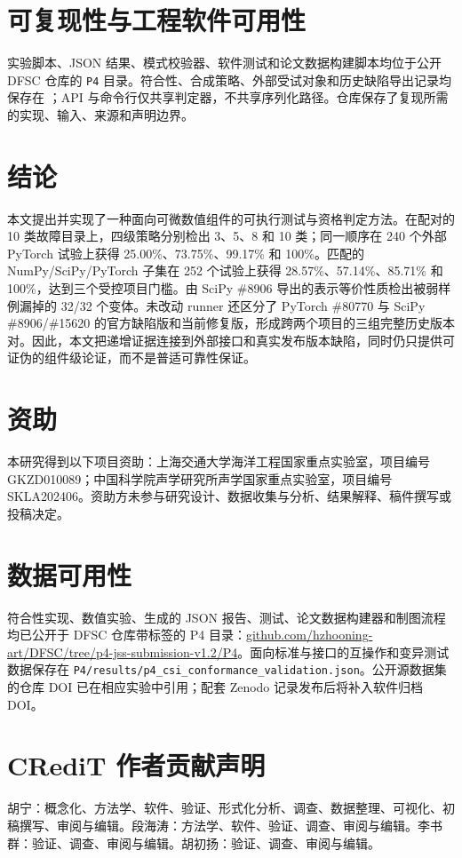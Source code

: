 \documentclass[preprint,12pt,authoryear]{elsarticle}
\begin{document}
\section{可复现性与工程软件可用性}
实验脚本、JSON 结果、模式校验器、软件测试和论文数据构建脚本均位于公开 DFSC 仓库的 \texttt{P4} 目录。符合性、合成策略、外部受试对象和历史缺陷导出记录均保存在 ；API 与命令行仅共享判定器，不共享序列化路径。仓库保存了复现所需的实现、输入、来源和声明边界。

\section{结论}
本文提出并实现了一种面向可微数值组件的可执行测试与资格判定方法。在配对的 10 类故障目录上，四级策略分别检出 3、5、8 和 10 类；同一顺序在 240 个外部 PyTorch 试验上获得 25.00\%、73.75\%、99.17\% 和 100\%。匹配的 NumPy/SciPy/PyTorch 子集在 252 个试验上获得 28.57\%、57.14\%、85.71\% 和 100\%，达到三个受控项目门槛。由 SciPy \#8906 导出的表示等价性质检出被弱样例漏掉的 32/32 个变体。未改动 runner 还区分了 PyTorch \#80770 与 SciPy \#8906/\#15620 的官方缺陷版和当前修复版，形成跨两个项目的三组完整历史版本对。因此，本文把递增证据连接到外部接口和真实发布版本缺陷，同时仍只提供可证伪的组件级论证，而不是普适可靠性保证。

\section*{资助}
本研究得到以下项目资助：上海交通大学海洋工程国家重点实验室，项目编号 GKZD010089；中国科学院声学研究所声学国家重点实验室，项目编号 SKLA202406。资助方未参与研究设计、数据收集与分析、结果解释、稿件撰写或投稿决定。

\section*{数据可用性}
符合性实现、数值实验、生成的 JSON 报告、测试、论文数据构建器和制图流程均已公开于 DFSC 仓库带标签的 P4 目录：\href{https://github.com/hzhooning-art/DFSC/tree/p4-jss-submission-v1.2/P4}{github.com/hzhooning-art/DFSC/tree/p4-jss-submission-v1.2/P4}。面向标准与接口的互操作和变异测试数据保存在 \texttt{P4/results/p4\_csi\_conformance\_validation.json}。公开源数据集的仓库 DOI 已在相应实验中引用；配套 Zenodo 记录发布后将补入软件归档 DOI。

\section*{CRediT 作者贡献声明}
胡宁：概念化、方法学、软件、验证、形式化分析、调查、数据整理、可视化、初稿撰写、审阅与编辑。段海涛：方法学、软件、验证、调查、审阅与编辑。李书群：验证、调查、审阅与编辑。胡初扬：验证、调查、审阅与编辑。
\end{document}
